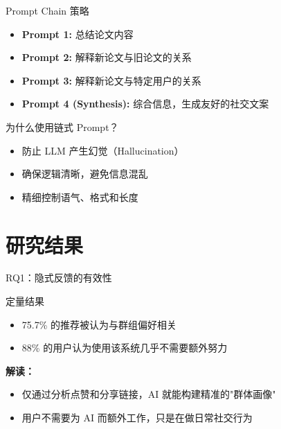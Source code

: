 \documentclass[UTF8,aspectratio=169]{ctexbeamer}
\begin{document}
\begin{frame}{Prompt Chain 策略}
\begin{itemize}
\item \textbf{Prompt 1:} 总结论文内容
\item \textbf{Prompt 2:} 解释新论文与旧论文的关系
\item \textbf{Prompt 3:} 解释新论文与特定用户的关系
\item \textbf{Prompt 4 (Synthesis):} 综合信息，生成友好的社交文案
\end{itemize}

\vspace{0.5cm}

\begin{exampleblock}{为什么使用链式 Prompt？}
\begin{itemize}
\item 防止 LLM 产生幻觉（Hallucination）
\item 确保逻辑清晰，避免信息混乱
\item 精细控制语气、格式和长度
\end{itemize}
\end{exampleblock}
\end{frame}

\section{研究结果}

\begin{frame}{RQ1：隐式反馈的有效性}
\begin{block}{定量结果}
\begin{itemize}
\item \textcolor{mygreen}{75.7\%} 的推荐被认为与群组偏好相关
\item \textcolor{mygreen}{88\%} 的用户认为使用该系统几乎不需要额外努力
\end{itemize}
\end{block}

\vspace{0.3cm}

\textbf{解读：}
\begin{itemize}
\item 仅通过分析点赞和分享链接，AI 就能构建精准的"群体画像"
\item 用户不需要为 AI 而额外工作，只是在做日常社交行为
\end{itemize}
\end{frame}
\end{document}
